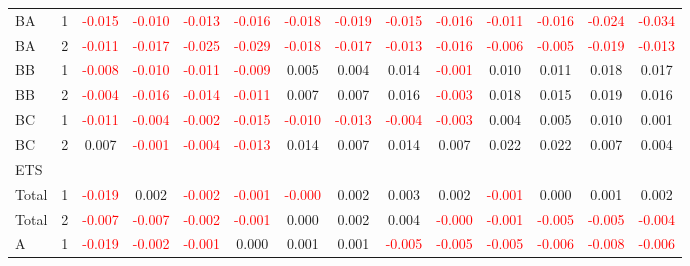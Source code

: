 \begin{table}[!htb]
{\begin{tabular}{llcccccccccccc}
BA & 1 & \textcolor{red}{-0.015} & \textcolor{red}{-0.010} & \textcolor{red}{-0.013} & \textcolor{red}{-0.016} & \textcolor{red}{-0.018} & \textcolor{red}{-0.019} & \textcolor{red}{-0.015} & \textcolor{red}{-0.016} & \textcolor{red}{-0.011} & \textcolor{red}{-0.016} & \textcolor{red}{-0.024} & \textcolor{red}{-0.034}\\
BA & 2 & \textcolor{red}{-0.011} & \textcolor{red}{-0.017} & \textcolor{red}{-0.025} & \textcolor{red}{-0.029} & \textcolor{red}{-0.018} & \textcolor{red}{-0.017} & \textcolor{red}{-0.013} & \textcolor{red}{-0.016} & \textcolor{red}{-0.006} & \textcolor{red}{-0.005} & \textcolor{red}{-0.019} & \textcolor{red}{-0.013}\\
BB & 1 & \textcolor{red}{-0.008} & \textcolor{red}{-0.010} & \textcolor{red}{-0.011} & \textcolor{red}{-0.009} & 0.005 & 0.004 & 0.014 & \textcolor{red}{-0.001} & 0.010 & 0.011 & 0.018 & 0.017\\
BB & 2 & \textcolor{red}{-0.004} & \textcolor{red}{-0.016} & \textcolor{red}{-0.014} & \textcolor{red}{-0.011} & 0.007 & 0.007 & 0.016 & \textcolor{red}{-0.003} & 0.018 & 0.015 & 0.019 & 0.016\\
BC & 1 & \textcolor{red}{-0.011} & \textcolor{red}{-0.004} & \textcolor{red}{-0.002} & \textcolor{red}{-0.015} & \textcolor{red}{-0.010} & \textcolor{red}{-0.013} & \textcolor{red}{-0.004} & \textcolor{red}{-0.003} & 0.004 & 0.005 & 0.010 & 0.001\\
BC & 2 & 0.007 & \textcolor{red}{-0.001} & \textcolor{red}{-0.004} & \textcolor{red}{-0.013} & 0.014 & 0.007 & 0.014 & 0.007 & 0.022 & 0.022 & 0.007 & 0.004\\
\hline
ETS &  &  &  &  &  &  &  &  &  &  &  &  & \\
\hline
Total & 1 & \textcolor{red}{-0.019} & 0.002 & \textcolor{red}{-0.002} & \textcolor{red}{-0.001} & \textcolor{red}{-0.000} & 0.002 & 0.003 & 0.002 & \textcolor{red}{-0.001} & 0.000 & 0.001 & 0.002\\
Total & 2 & \textcolor{red}{-0.007} & \textcolor{red}{-0.007} & \textcolor{red}{-0.002} & \textcolor{red}{-0.001} & 0.000 & 0.002 & 0.004 & \textcolor{red}{-0.000} & \textcolor{red}{-0.001} & \textcolor{red}{-0.005} & \textcolor{red}{-0.005} & \textcolor{red}{-0.004}\\
A & 1 & \textcolor{red}{-0.019} & \textcolor{red}{-0.002} & \textcolor{red}{-0.001} & 0.000 & 0.001 & 0.001 & \textcolor{red}{-0.005} & \textcolor{red}{-0.005} & \textcolor{red}{-0.005} & \textcolor{red}{-0.006} & \textcolor{red}{-0.008} & \textcolor{red}{-0.006}\\

\end{tabular}}
\end{table}

